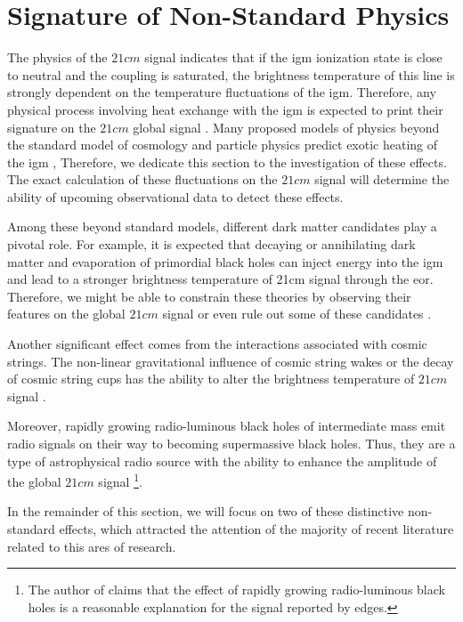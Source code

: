 \documentclass[12pt, TexShade, letterpaper]{report}
\begin{document}
\section{Signature of Non-Standard Physics}
\label{chap:global21cm,sub:non_standard}
The physics of the $21cm$ signal indicates that if the \gls{igm} ionization state is close to neutral and the coupling is saturated, the brightness temperature of this line is strongly dependent on the temperature fluctuations of the \gls{igm}. Therefore, any physical process involving heat exchange with the \gls{igm} is expected to print their signature on the $21cm$ global signal \cite{21century}. Many proposed models of physics beyond the standard model of cosmology and particle physics predict exotic heating of the 
\gls{igm} \cite{21century}, Therefore, we dedicate this section to the investigation of these effects. The exact calculation of these fluctuations on the $21cm$ signal will determine the ability of upcoming observational data to detect these effects.\par
Among these beyond standard models, different dark matter candidates play a pivotal role. For example, it is expected that decaying or annihilating dark matter and evaporation of primordial black holes can inject energy into the \gls{igm} and lead to a stronger brightness temperature of 21cm signal through the \gls{eor}. Therefore, we might be able to constrain these theories by observing their features on the global $21cm$ signal \cite{primordial_bh, new_physics_thesis, primordial_bh_binary, 21limit_dm_bh, bound_dm} or even rule out some of these candidates \cite{rule_out}.\par
Another significant effect comes from the interactions associated with cosmic strings. The non-linear gravitational influence of cosmic string wakes or the decay of cosmic string cups has the ability to alter the brightness temperature of $21cm$ signal \cite{WF_effect_oscar, cosmic_string_oscar, string_loop_robert}. \par
Moreover, rapidly growing radio-luminous black holes of intermediate mass emit radio signals on their way to becoming supermassive black holes. Thus, they are a type of astrophysical radio source with the ability to enhance the amplitude of the global $21cm$ signal \cite{bh_cosmioc_dawn} \footnote{The author of \cite{bh_cosmioc_dawn} claims that the effect of rapidly growing radio-luminous black holes is a reasonable explanation for the signal reported by \gls{edges}.}. \par
In the remainder of this section, we will focus on two of these distinctive non-standard effects, which attracted the attention of the majority of recent literature related to this ares of research.\par
\end{document}
